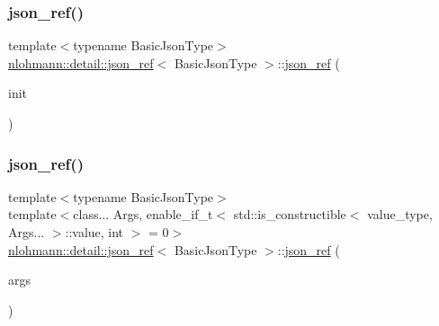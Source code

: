 \mbox{\label{classnlohmann_1_1detail_1_1json__ref_adfba2db547283a7c6a5df9a32e72efc5}} 
\subsubsection{\texorpdfstring{json\+\_\+ref()}{json\_ref()}\hspace{0.1cm}{\footnotesize\ttfamily [3/6]}}
{\footnotesize\ttfamily template$<$typename Basic\+Json\+Type$>$ \\
\hyperlink{classnlohmann_1_1detail_1_1json__ref}{nlohmann\+::detail\+::json\+\_\+ref}$<$ Basic\+Json\+Type $>$\+::\hyperlink{classnlohmann_1_1detail_1_1json__ref}{json\+\_\+ref} (\begin{DoxyParamCaption}\item[{std\+::initializer\+\_\+list$<$ \hyperlink{classnlohmann_1_1detail_1_1json__ref}{json\+\_\+ref}$<$ Basic\+Json\+Type $>$ $>$}]{init }\end{DoxyParamCaption})\hspace{0.3cm}{\ttfamily [inline]}}

\mbox{\label{classnlohmann_1_1detail_1_1json__ref_a8a31d6c588d6c3c06b62008fd5d36c6c}} 
\subsubsection{\texorpdfstring{json\+\_\+ref()}{json\_ref()}\hspace{0.1cm}{\footnotesize\ttfamily [4/6]}}
{\footnotesize\ttfamily template$<$typename Basic\+Json\+Type$>$ \\
template$<$class... Args, enable\+\_\+if\+\_\+t$<$ std\+::is\+\_\+constructible$<$ value\+\_\+type, Args... $>$\+::value, int $>$  = 0$>$ \\
\hyperlink{classnlohmann_1_1detail_1_1json__ref}{nlohmann\+::detail\+::json\+\_\+ref}$<$ Basic\+Json\+Type $>$\+::\hyperlink{classnlohmann_1_1detail_1_1json__ref}{json\+\_\+ref} (\begin{DoxyParamCaption}\item[{Args \&\&...}]{args }\end{DoxyParamCaption})\hspace{0.3cm}{\ttfamily [inline]}}

